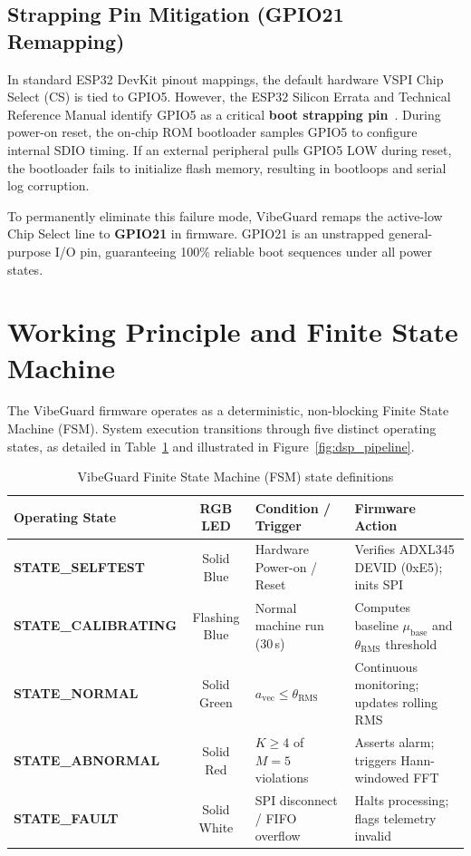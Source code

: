 \subsection{Strapping Pin Mitigation (GPIO21 Remapping)}
In standard ESP32 DevKit pinout mappings, the default hardware VSPI Chip Select (CS) is tied to GPIO5. However, the ESP32 Silicon Errata and Technical Reference Manual identify GPIO5 as a critical \textbf{boot strapping pin}~\cite{esp32_trm}. During power-on reset, the on-chip ROM bootloader samples GPIO5 to configure internal SDIO timing. If an external peripheral pulls GPIO5 LOW during reset, the bootloader fails to initialize flash memory, resulting in bootloops and serial log corruption.

To permanently eliminate this failure mode, VibeGuard remaps the active-low Chip Select line to \textbf{GPIO21} in firmware. GPIO21 is an unstrapped general-purpose I/O pin, guaranteeing 100\% reliable boot sequences under all power states.

\section{Working Principle and Finite State Machine}
The VibeGuard firmware operates as a deterministic, non-blocking Finite State Machine (FSM). System execution transitions through five distinct operating states, as detailed in Table~\ref{tab:fsm_states} and illustrated in Figure~\ref{fig:dsp_pipeline}.

\begin{table}[H]
\centering
\begin{tabular}{|l|c|l|l|}
\hline
\textbf{Operating State} & \textbf{RGB LED} & \textbf{Condition / Trigger} & \textbf{Firmware Action} \\
\hline
\textbf{STATE\_SELFTEST} & Solid Blue & Hardware Power-on / Reset & Verifies ADXL345 DEVID (0xE5); inits SPI \\
\textbf{STATE\_CALIBRATING} & Flashing Blue & Normal machine run (30\,s) & Computes baseline $\mu_{\mathrm{base}}$ and $\theta_{\mathrm{RMS}}$ threshold \\
\textbf{STATE\_NORMAL} & Solid Green & $a_{\mathrm{vec}} \le \theta_{\mathrm{RMS}}$ & Continuous monitoring; updates rolling RMS \\
\textbf{STATE\_ABNORMAL} & Solid Red & $K \ge 4$ of $M=5$ violations & Asserts alarm; triggers Hann-windowed FFT \\
\textbf{STATE\_FAULT} & Solid White & SPI disconnect / FIFO overflow & Halts processing; flags telemetry invalid \\
\hline
\end{tabular}
\caption{VibeGuard Finite State Machine (FSM) state definitions}
\label{tab:fsm_states}
\end{table}

